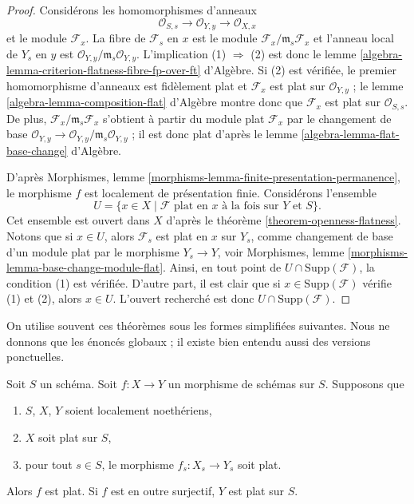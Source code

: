 \begin{proof}
Considérons les homomorphismes d'anneaux
$$
\mathcal{O}_{S, s} \longrightarrow
\mathcal{O}_{Y, y} \longrightarrow \mathcal{O}_{X, x}
$$
et le module $\mathcal{F}_x$. La fibre de $\mathcal{F}_s$ en $x$
est le module $\mathcal{F}_x/\mathfrak m_s \mathcal{F}_x$ et
l'anneau local de $Y_s$ en $y$ est
$\mathcal{O}_{Y, y}/\mathfrak m_s \mathcal{O}_{Y, y}$.
L'implication (1) $\Rightarrow$ (2) est donc le
lemme \ref{algebra-lemma-criterion-flatness-fibre-fp-over-ft} d'Algèbre.
Si (2) est vérifiée, le premier homomorphisme d'anneaux est fidèlement plat
et $\mathcal{F}_x$ est plat sur $\mathcal{O}_{Y, y}$ ; le
lemme \ref{algebra-lemma-composition-flat} d'Algèbre
montre donc que $\mathcal{F}_x$ est plat sur $\mathcal{O}_{S, s}$.
De plus, $\mathcal{F}_x/\mathfrak m_s \mathcal{F}_x$ s'obtient
à partir du module plat $\mathcal{F}_x$ par le changement de base
$\mathcal{O}_{Y, y} \to \mathcal{O}_{Y, y}/\mathfrak m_s \mathcal{O}_{Y, y}$ ;
il est donc plat d'après le
lemme \ref{algebra-lemma-flat-base-change} d'Algèbre.

\medskip\noindent
D'après
Morphismes, lemme \ref{morphisms-lemma-finite-presentation-permanence},
le morphisme $f$ est localement de présentation finie.
Considérons l'ensemble
\begin{equation}
\label{equation-open}
U = \{x \in X \mid \mathcal{F} \text{ plat en }x
\text{ à la fois sur }Y\text{ et }S\}.
\end{equation}
Cet ensemble est ouvert dans $X$ d'après le
théorème \ref{theorem-openness-flatness}.
Notons que si $x \in U$, alors $\mathcal{F}_s$ est plat en
$x$ sur $Y_s$, comme changement de base d'un module plat par le
morphisme $Y_s \to Y$, voir
Morphismes, lemme \ref{morphisms-lemma-base-change-module-flat}.
Ainsi, en tout point de $U \cap \text{Supp}(\mathcal{F})$,
la condition (1) est vérifiée. D'autre part, il est
clair que si $x \in \text{Supp}(\mathcal{F})$ vérifie
(1) et (2), alors $x \in U$. L'ouvert recherché est donc
$U \cap \text{Supp}(\mathcal{F})$.
\end{proof}

\noindent
On utilise souvent ces théorèmes sous les formes simplifiées suivantes.
Nous ne donnons que les énoncés globaux ; il existe bien entendu aussi des
versions ponctuelles.

\begin{lemma}
\label{lemma-morphism-between-flat-Noetherian}
Soit $S$ un schéma.
Soit $f : X \to Y$ un morphisme de schémas sur $S$.
Supposons que
\begin{enumerate}
\item $S$, $X$, $Y$ soient localement noethériens,
\item $X$ soit plat sur $S$,
\item pour tout $s \in S$, le morphisme
$f_s : X_s \to Y_s$ soit plat.
\end{enumerate}
Alors $f$ est plat. Si $f$ est en outre surjectif, $Y$ est plat sur $S$.
\end{lemma}

